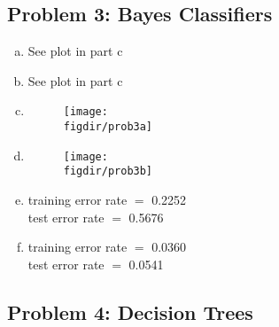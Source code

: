 \documentclass[twoside,11pt]{article}
\newcommand{\figdir}{figs}
\theoremstyle{definition}
\begin{document}

\subsection*{Problem 3: Bayes Classifiers}

\begin{enumerate}[(a)]
	\item See plot in part c
	\item See plot in part c
	
	\item
		\begin{figure}[H] \centering
		\texttt{[image: \\figdir/prob3a]} \\
		\end{figure}
		
	\item
		\begin{figure}[H] \centering
		\texttt{[image: \\figdir/prob3b]} \\
		\end{figure}

	\item training error rate $=$ 0.2252 \\
		test error rate $=$ 0.5676
	
	\item training error rate $=$ 0.0360 \\
		test error rate $=$ 0.0541
	
\end{enumerate}



\subsection*{Problem 4: Decision Trees}
\end{document}
